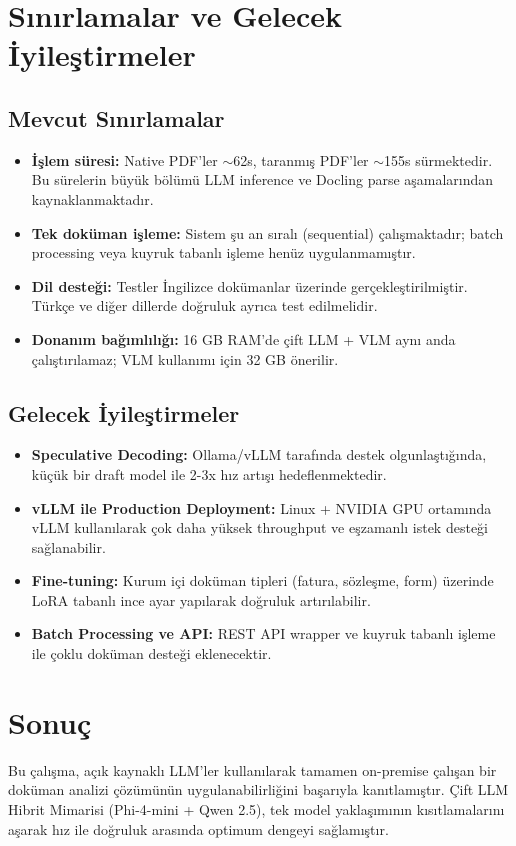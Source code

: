 \documentclass[11pt,a4paper]{article}
\begin{document}
\section{Sınırlamalar ve Gelecek İyileştirmeler}

\subsection{Mevcut Sınırlamalar}
\begin{itemize}[noitemsep]
\item \textbf{İşlem süresi:} Native PDF'ler $\sim$62s, taranmış PDF'ler $\sim$155s sürmektedir. Bu sürelerin büyük bölümü LLM inference ve Docling parse aşamalarından kaynaklanmaktadır.
\item \textbf{Tek doküman işleme:} Sistem şu an sıralı (sequential) çalışmaktadır; batch processing veya kuyruk tabanlı işleme henüz uygulanmamıştır.
\item \textbf{Dil desteği:} Testler İngilizce dokümanlar üzerinde gerçekleştirilmiştir. Türkçe ve diğer dillerde doğruluk ayrıca test edilmelidir.
\item \textbf{Donanım bağımlılığı:} 16 GB RAM'de çift LLM + VLM aynı anda çalıştırılamaz; VLM kullanımı için 32 GB önerilir.
\end{itemize}

\subsection{Gelecek İyileştirmeler}
\begin{itemize}[noitemsep]
\item \textbf{Speculative Decoding:} Ollama/vLLM tarafında destek olgunlaştığında, küçük bir draft model ile 2-3x hız artışı hedeflenmektedir.
\item \textbf{vLLM ile Production Deployment:} Linux + NVIDIA GPU ortamında vLLM kullanılarak çok daha yüksek throughput ve eşzamanlı istek desteği sağlanabilir.
\item \textbf{Fine-tuning:} Kurum içi doküman tipleri (fatura, sözleşme, form) üzerinde LoRA tabanlı ince ayar yapılarak doğruluk artırılabilir.
\item \textbf{Batch Processing ve API:} REST API wrapper ve kuyruk tabanlı işleme ile çoklu doküman desteği eklenecektir.
\end{itemize}

\section{Sonuç}
Bu çalışma, açık kaynaklı LLM'ler kullanılarak tamamen on-premise çalışan bir doküman analizi çözümünün uygulanabilirliğini başarıyla kanıtlamıştır. Çift LLM Hibrit Mimarisi (Phi-4-mini + Qwen 2.5), tek model yaklaşımının kısıtlamalarını aşarak hız ile doğruluk arasında optimum dengeyi sağlamıştır.
\end{document}
